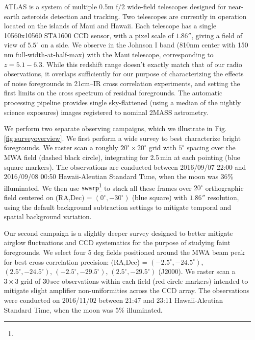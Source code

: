 \documentclass{emulateapj}
\begin{document}
ATLAS is a system of multiple 0.5m f/2 wide-field telescopes \citep{tonry11} designed for near-earth asteroids detection and tracking. Two telescopes are currently in operation located on the islands of Maui and Hawaii.   Each telescope has a single 10560x10560 STA1600 CCD sensor, with a pixel scale of $1.86''$, giving a field of view of $5.5^\circ$ on a side.  We observe in the Johnson I band (810nm center with 150\,nm full-width-at-half-max) with the Maui telescope, corresponding to $z=5.1-6.3$.  While this redshift range doesn't exactly match that of our radio observations, it overlaps sufficiently for our purpose of characterizing the effects of noise foregrounds in 21cm--IR cross correlation experiments, and setting the first limits on the cross spectrum of residual foregrounds. The automatic processing pipeline provides single sky-flattened (using a median of the nightly science exposures) images registered to nominal 2MASS astrometry.

We perform two separate observing campaigns, which we illustrate in Fig. \ref{fig:surveyoverview}. We first perform a wide survey to best characterize bright foregrounds. We raster scan a roughly $20^\circ\times20^\circ$ grid with $5^\circ$ spacing over the MWA field (dashed black circle), integrating for 2.5\,min at each pointing (blue square markers). The observations are conducted between 2016/09/07 22:00  and 2016/09/08 00:50 Hawaii-Aleutian Standard Time, when the moon was 36\% illuminated. We then use {\tt swarp}\footnote{} \citep{swarp} to stack all these frames over $20^\circ$ orthographic field centered on (RA,Dec) = $(0^\circ,-30^\circ)$ (blue square) with $1.86''$ resolution, using the default background subtraction settings to mitigate temporal and spatial background variation. 


Our second campaign is a slightly deeper survey designed to better mitigate airglow fluctuations and CCD systematics for the purpose of studying faint foregrounds. We select four 5 deg fields positioned around the MWA beam peak for best cross correlation precision: (RA,Dec) = $(-2.5^\circ, -24.5^\circ)$, $(2.5^\circ, -24.5^\circ)$, $(-2.5^\circ, -29.5^\circ)$, $(2.5^\circ, -29.5^\circ)$ (J2000). We raster scan a $3\times3$ grid of 30\,sec observations within each field (red circle markers) intended to mitigate slight amplifier non-uniformities across the CCD array. The observations were conducted on 2016/11/02 between 21:47 and 23:11 Hawaii-Aleutian Standard Time, when the moon was 5\% illuminated. 
\end{document}
